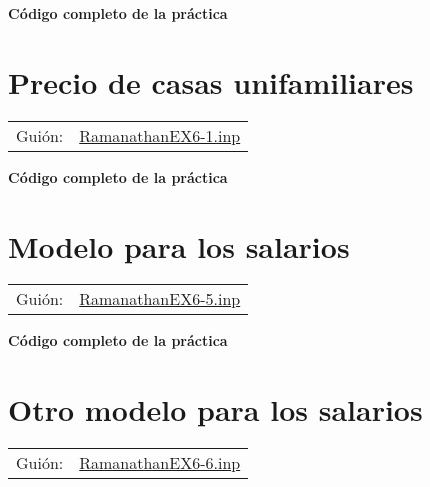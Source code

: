 \documentclass[11pt]{article}
\begin{document}
\vspace{10pt}
\noindent
\textbf{Código completo de la práctica}
\vspace{10pt}

\clearpage

\section{Precio de casas unifamiliares}
\label{sec:org04f9c21}
\begin{center}
\begin{tabular}{ll}
Guión: & \href{https://github.com/mbujosab/Ectr/tree/master/Practicas/Gretl/scripts/RamanathanEX6-1.inp}{RamanathanEX6-1.inp}\\
\end{tabular}
\end{center}

\vspace{10pt}
\noindent
\textbf{Código completo de la práctica}
\vspace{10pt}


\clearpage

\section{Modelo para los salarios}
\label{sec:org9495088}
\begin{center}
\begin{tabular}{ll}
Guión: & \href{https://github.com/mbujosab/Ectr/tree/master/Practicas/Gretl/scripts/RamanathanEX6-5.inp}{RamanathanEX6-5.inp}\\
\end{tabular}
\end{center}

\vspace{10pt}
\noindent
\textbf{Código completo de la práctica}
\vspace{10pt}

\clearpage

\section{Otro modelo para los salarios}
\label{sec:org6971184}
\begin{center}
\begin{tabular}{ll}
Guión: & \href{https://github.com/mbujosab/Ectr/tree/master/Practicas/Gretl/scripts/RamanathanEX6-6.inp}{RamanathanEX6-6.inp}\\
\end{tabular}
\end{center}
\end{document}
